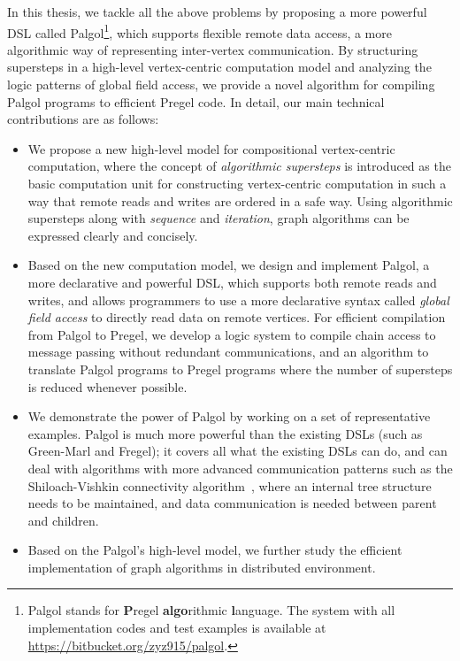 \documentclass{sokendai_thesis} %
\begin{document}
In this thesis, we tackle all the above problems by proposing a more powerful DSL called Palgol\footnote{Palgol stands for {\bf P}regel {\bf algo}rithmic {\bf l}anguage.
The system with all implementation codes and test examples is available at \url{https://bitbucket.org/zyz915/palgol}.}, which supports flexible remote data access, a more algorithmic way of representing inter-vertex communication.
By structuring supersteps in a high-level vertex-centric computation model and analyzing the logic patterns of global field access, we provide a novel algorithm for compiling Palgol programs to efficient Pregel code. 
In detail, our main technical contributions are as follows:
\begin{itemize}\setlength\itemsep{0em}
\item
 We propose a new high-level model for compositional vertex-centric computation, where the concept of \emph{algorithmic supersteps} is introduced as the basic computation unit for constructing vertex-centric computation in such a way that remote reads and writes are ordered in a safe way.
 Using algorithmic supersteps along with \emph{sequence} and \emph{iteration}, graph algorithms can be expressed clearly and concisely.
\item
 Based on the new computation model, we design and implement Palgol, a more declarative and powerful DSL, which supports both remote reads and writes, and allows programmers to use a more declarative syntax called \emph{global field access} to directly read data on remote vertices.
 For efficient compilation from Palgol to Pregel, we develop a logic system to compile chain access to message passing without redundant communications, and an algorithm to translate Palgol programs to Pregel programs where the number of supersteps is reduced whenever possible.
\item
 We demonstrate the power of Palgol by working on a set of representative examples.
 Palgol is much more powerful than the existing DSLs (such as Green-Marl and Fregel); it covers all what the existing DSLs can do, and can deal with algorithms with more advanced communication patterns such as the Shiloach-Vishkin connectivity algorithm~\cite{connectivity}, where an internal tree structure needs to be maintained, and data communication is needed between parent and children.
\item
 Based on the Palgol's high-level model, we further study the efficient implementation of graph algorithms in distributed environment.

\end{itemize}
\end{document}
